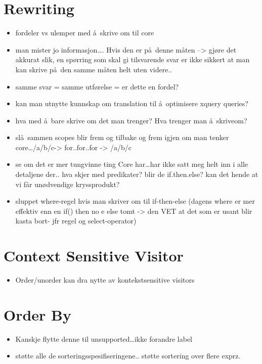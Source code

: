 \section{Rewriting}
\label{sect:disc:rewriting}
\begin{itemize}
  \item fordeler vs ulemper med \aa~skrive om til core
  \item man mister jo informasjon\ldots. Hvis den er p\aa~denne m\aa ten --> gj\o re det akkurat
	  slik, en sp\o rring som skal gi tilsvarende svar er ikke sikkert at man kan
	  skrive p\aa~den samme m\aa ten helt uten videre..  
  \item samme svar = samme utf\o relse = er dette en fordel?
  \item kan man utnytte kunnskap om translation til \aa~optimisere xquery queries?
  \item hva med \aa~bare skrive om det man trenger? Hva trenger man \aa~skriveom?
  \item sl\aa~sammen scopes blir frem og tilbake og frem igjen om man tenker core\ldots /a/b/c-> for..for..for ->
  /a/b/c
  \item se om det er mer tungvinne ting Core har\ldots har ikke satt meg helt inn i alle detaljene der.. hva skjer
  med predikater? blir de if.then.else? kan det hende at vi f\aa r un\o dvendige kryssprodukt?
  \item sluppet where-regel hvis man skriver om til if-then-else (dagens where er mer effektiv enn en if() then no
 e else tomt -> den VET at det som er usant blir kasta bort- jfr regel og select-operator)
\end{itemize}





\section{Context Sensitive Visitor}
\label{sect:disc:contextSens}
\begin{itemize}
  \item Order/unorder kan dra nytte av kontekstsensitive visitors
\end{itemize}


\section{Order By}
\label{sect:disc:orderby}
\begin{itemize}
  \item Kanskje flytte denne til unsupported\ldots ikke forandre label
  \item st\o tte alle de sorteringsspesifiseringene.. st\o tte sortering over flere exprz.
\end{itemize}


